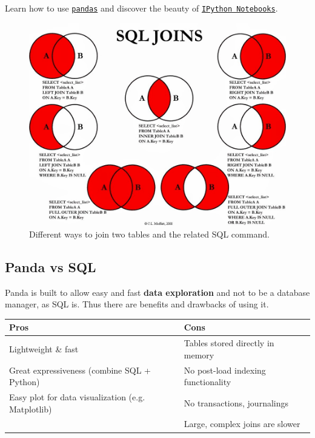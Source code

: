 Learn how to use \href{https://github.com/ADAEPFL/Labs/tree/master/02\%20-\%20Intro\%20to\%20Pandas}{\texttt{pandas}} and discover the beauty of \href{https://github.com/ADAEPFL/Labs/tree/master/01\%20-\%20Intro\%20to\%20Tools}{\texttt{IPython Notebooks}}.

\begin{figure}%
 \centering
 \includegraphics[width=12cm]{./img/02/SQL_joins}
 \caption{\label{join_SQL} Different ways to join two tables and the related SQL command.}
\end{figure}


\subsection{Panda vs SQL}

Panda is built to allow easy and fast \textbf{data exploration} and not to be a database manager, as SQL is. Thus there are benefits and drawbacks of using it.


\begin{center} %
\begin{tabular} {| l | l |}
\hline
\bf Pros & \bf Cons \\ \hline
Lightweight \& fast & Tables stored directly in memory \\
Great expressiveness (combine SQL + Python) & No post-load indexing functionality\\
Easy plot for data visualization (e.g. Matplotlib) & No transactions, journalings\\ 
& Large, complex joins are slower \\ \hline
\end{tabular}
\end{center}


